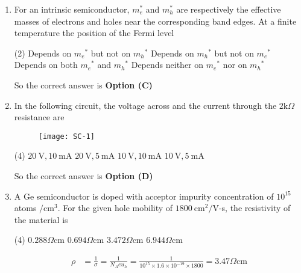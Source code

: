 \begin{enumerate}
	\item For an intrinsic semiconductor, $m_{e}^{*}$ and $m_{h}^{*}$ are respectively the effective masses of electrons and holes near the corresponding band edges. At a finite temperature the position of the Fermi level
	{	}
	\begin{tasks}(2)
		\task[\textbf{A.}] Depends on $m_{e}{ }^{*}$ but not on $m_{h}{ }^{*}$
		\task[\textbf{B.}] Depends on $m_{h}{ }^{*}$ but not on $m_{e}{ }^{*}$
		\task[\textbf{C.}] Depends on both $m_{e}{ }^{*}$ and $m_{h}{ }^{*}$
		\task[\textbf{D.}] Depends neither on $m_{e}{ }^{*}$ nor on $m_{h}{ }^{*}$
	\end{tasks}
	\begin{answer}
		So the correct answer is \textbf{Option (C)}
	\end{answer}
	\item In the following circuit, the voltage across and the current through the $2 \mathrm{k} \Omega$ resistance are
	{	}
	\begin{figure}[H]
		\centering
		\texttt{[image: SC-1]}
	\end{figure}
	\begin{tasks}(4)
		\task[\textbf{A.}] $20 \mathrm{~V}, 10 \mathrm{~mA}$
		\task[\textbf{B.}] $20 \mathrm{~V}, 5 \mathrm{~mA}$
		\task[\textbf{C.}] $10 \mathrm{~V}, 10 \mathrm{~mA}$
		\task[\textbf{D.}] $10 \mathrm{~V}, 5 \mathrm{~mA}$
	\end{tasks}
	\begin{answer}
		So the correct answer is \textbf{Option (D)}
	\end{answer}
	\item A Ge semiconductor is doped with acceptor impurity concentration of $10^{15}$ atoms $/ \mathrm{cm}^{3}$. For the given hole mobility of $1800 \mathrm{~cm}^{2} / \mathrm{V}$-s, the resistivity of the material is
	{	}
	\begin{tasks}(4)
		\task[\textbf{A.}] $0.288 \Omega \mathrm{cm}$
		\task[\textbf{B.}] $0.694 \Omega \mathrm{cm}$
		\task[\textbf{C.}] $3.472 \Omega \mathrm{cm}$
		\task[\textbf{D.}] $6.944 \Omega \mathrm{cm}$
	\end{tasks}
	\begin{answer}
		\begin{align*}
		\rho&=\frac{1}{\sigma}=\frac{1}{N_{A} e u_{h}}=\frac{1}{10^{15} \times 1.6 \times 10^{-19} \times 1800}=3.47 \Omega \mathrm{cm}
		\end{align*}

\end{answer}
\end{enumerate}
